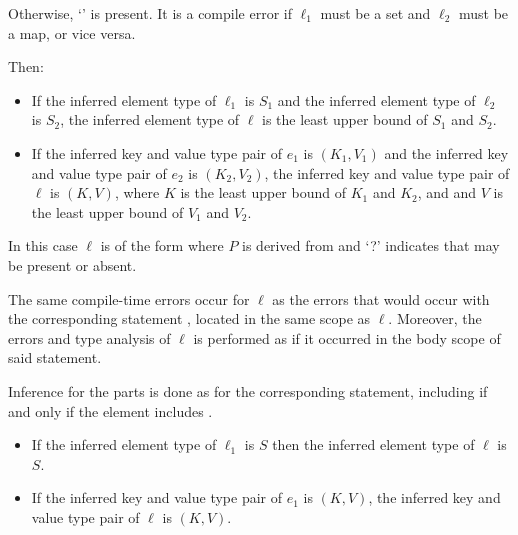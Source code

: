 \documentclass[makeidx]{article}
\begin{document}
{Otherwise, `' is present.
It is a compile error if $\ell_1$ must be a set and $\ell_2$ must be a map,
or vice versa.


Then:

\begin{itemize}
\item
  If the inferred element type of $\ell_1$ is $S_1$ and
  the inferred element type of $\ell_2$ is $S_2$,
  the inferred element type of $\ell$ is
  the least upper bound of $S_1$ and $S_2$.
\item
  If the inferred key and value type pair of $e_1$ is
  $(K_1, V_1)$
  and the inferred key and value type pair of $e_2$ is
  $(K_2, V_2)$,
  the inferred key and value type pair of $\ell$ is
  $(K, V)$,
  where $K$ is the least upper bound of $K_1$ and $K_2$, and
  and $V$ is the least upper bound of $V_1$ and $V_2$.
\end{itemize}
\vspace{-5mm}
\EndCase

\LMHash{}%
In this case $\ell$ is of the form
where $P$ is derived from  and
`\AWAIT?' indicates that \AWAIT{} may be present or absent.

The same compile-time errors occur for $\ell$ as
the errors that would occur with the corresponding \FOR{} statement
,
located in the same scope as $\ell$.
Moreover, the errors and type analysis of $\ell$ is performed
as if it occurred in the body scope of said \FOR{} statement.


Inference for the parts
is done as for the corresponding \FOR{} statement,
including \AWAIT{} if and only if the element includes \AWAIT.

\begin{itemize}
\item
  If the inferred element type of $\ell_1$ is $S$ then
  the inferred element type of $\ell$ is $S$.
\item
  If the inferred key and value type pair of $e_1$ is $(K, V)$,
  the inferred key and value type pair of $\ell$ is $(K, V)$.
\end{itemize}

}
\end{document}
